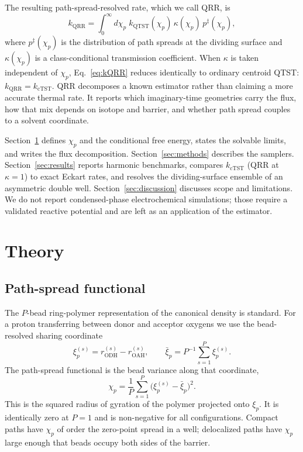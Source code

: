 \documentclass[%
 aip,
 jcp,
 amsmath,amssymb,
 reprint,
 floatfix,
]{revtex4-2}
\newcommand{\xip}{\bar{\xi}_p}
\newcommand{\chip}{\chi_p}
\newcommand{\kQRR}{k_{\mathrm{QRR}}}
\newcommand{\kQTST}{k_{\mathrm{QTST}}}
\newcommand{\kcTST}{k_{\mathrm{cTST}}}
\begin{document}
The resulting path-spread-resolved rate, which we call QRR, is
\begin{equation}
  \kQRR
  =
  \int_0^\infty d\chip\;
  \kQTST(\chip)\,
  \kappa(\chip)\,
  p^\ddagger(\chip),
  \label{eq:kQRR}
\end{equation}
where $p^\ddagger(\chip)$ is the distribution of path spreads at the dividing surface and $\kappa(\chip)$ is a class-conditional transmission coefficient. When $\kappa$ is taken independent of $\chip$, Eq.~\eqref{eq:kQRR} reduces identically to ordinary centroid QTST: $\kQRR=\kcTST$. QRR decomposes a known estimator rather than claiming a more accurate thermal rate. It reports which imaginary-time geometries carry the flux, how that mix depends on isotope and barrier, and whether path spread couples to a solvent coordinate.

Section~\ref{sec:theory} defines $\chip$ and the conditional free energy, states the solvable limits, and writes the flux decomposition. Section~\ref{sec:methods} describes the samplers. Section~\ref{sec:results} reports harmonic benchmarks, compares $\kcTST$ (QRR at $\kappa=1$) to exact Eckart rates, and resolves the dividing-surface ensemble of an asymmetric double well. Section~\ref{sec:discussion} discusses scope and limitations. We do not report condensed-phase electrochemical simulations; those require a validated reactive potential and are left as an application of the estimator.

\section{Theory}
\label{sec:theory}

\subsection{Path-spread functional}

The $P$-bead ring-polymer representation of the canonical density is standard.\cite{chandler1981,cao1994} For a proton transferring between donor and acceptor oxygens we use the bead-resolved sharing coordinate
\begin{equation}
  \xi_p^{(s)} = r_{\mathrm{ODH}}^{(s)} - r_{\mathrm{OAH}}^{(s)},
  \qquad
  \xip = P^{-1}\sum_{s=1}^{P}\xi_p^{(s)}.
\end{equation}
The path-spread functional is the bead variance along that coordinate,
\begin{equation}
  \chip
  =
  \frac{1}{P}\sum_{s=1}^{P}
  \bigl(\xi_p^{(s)}-\xip\bigr)^2.
  \label{eq:chip}
\end{equation}
This is the squared radius of gyration of the polymer projected onto $\xi_p$. It is identically zero at $P=1$ and is non-negative for all configurations. Compact paths have $\chip$ of order the zero-point spread in a well; delocalized paths have $\chip$ large enough that beads occupy both sides of the barrier.
\end{document}
